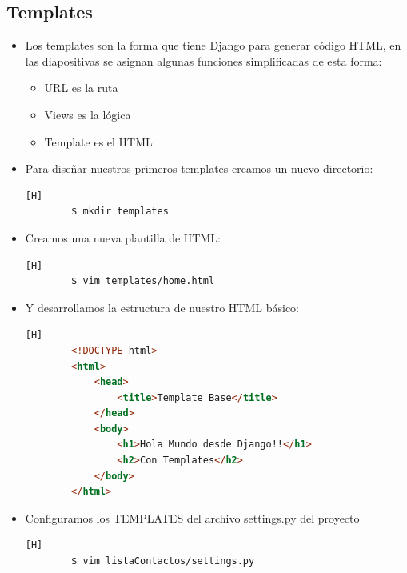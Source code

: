 \documentclass{article}
\begin{document}
        \subsection{Templates}
        \begin{itemize}
            \item Los templates son la forma que tiene Django para generar código HTML, en las diapositivas se asignan algunas funciones simplificadas de esta forma:
            \begin{itemize}
                \item URL es la ruta
                \item Views es la lógica
                \item Template es el HTML
            \end{itemize}
            \item Para diseñar nuestros primeros templates creamos un nuevo directorio:
        \begin{lstlisting}[language=bash,caption={Directorio templates}][H]
        $ mkdir templates
        \end{lstlisting}
        
            \item Creamos una nueva plantilla de HTML:
            
        \begin{lstlisting}[language=bash,caption={Creando el archivo home.html}][H]
        $ vim templates/home.html
        \end{lstlisting}

            \item Y desarrollamos la estructura de nuestro HTML básico:
            
        \begin{lstlisting}[language=HTML,caption={Contenido de home.html}][H]
        <!DOCTYPE html>
        <html>
            <head>
                <title>Template Base</title>
            </head>
            <body>
                <h1>Hola Mundo desde Django!!</h1>
                <h2>Con Templates</h2>
            </body>
        </html>
        \end{lstlisting}

            \item Configuramos los TEMPLATES del archivo settings.py del proyecto 
            
        \begin{lstlisting}[language=bash,caption={Ingresando a settings.py}][H]
        $ vim listaContactos/settings.py
        \end{lstlisting}


\end{itemize}
\end{document}
